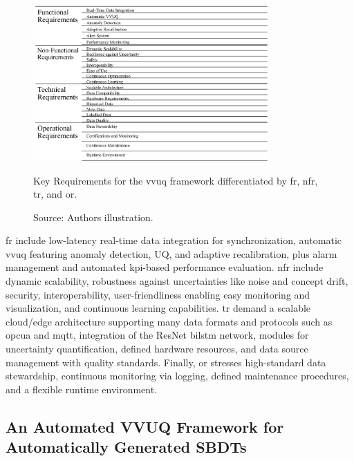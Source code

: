 \begin{figure}[htbp]
  \centering
  \includegraphics[width=0.8\textwidth]{figures/req.png}
  \caption[Key Requirements for VVUQ]{Key Requirements for the \gls{vvuq} framework differentiated by \gls{fr}, \gls{nfr}, \gls{tr}, and \gls{or}. }
  \caption*{Source: Authors illustration.}
  \label{fig:requirements}
\end{figure}

\gls{fr} include low-latency real-time data integration for synchronization, automatic \gls{vvuq} featuring anomaly detection, UQ, and adaptive recalibration, plus alarm management and automated \gls{kpi}-based performance evaluation. \gls{nfr} include dynamic scalability, robustness against uncertainties like noise and concept drift, security, interoperability, user-friendliness enabling easy monitoring and visualization, and continuous learning capabilities. \gls{tr} demand a scalable cloud/edge architecture supporting many data formats and protocols such as \gls{opcua} and \gls{mqtt}, integration of the ResNet \gls{bilstm} network, modules for uncertainty quantification, defined hardware resources, and data source management with quality standards. Finally, \gls{or} stresses high-standard data stewardship, continuous monitoring via logging, defined maintenance procedures, and a flexible runtime environment.

\subsection{An Automated VVUQ Framework for Automatically Generated SBDTs}
\label{sec:framework}

